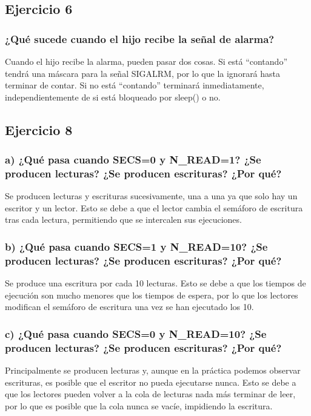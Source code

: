 \documentclass[]{article}
\begin{document}
\subsection*{Ejercicio 6}
\subsubsection*{¿Qué sucede cuando el hijo recibe la señal de alarma?}
Cuando el hijo recibe la alarma, pueden pasar dos cosas. Si está ``contando'' tendrá una máscara para la señal SIGALRM, por lo que la ignorará hasta terminar de contar. Si no está ``contando'' terminará inmediatamente, independientemente de si está bloqueado por sleep() o no.

\subsection*{Ejercicio 8}
\subsubsection*{a) ¿Qué pasa cuando SECS=0 y N\_READ=1? ¿Se producen lecturas? ¿Se producen escrituras? ¿Por qué?}
Se producen lecturas y escrituras sucesivamente, una a una ya que solo hay un escritor y un lector. Esto se debe a que el lector cambia el semáforo de escritura tras cada lectura, permitiendo que se intercalen sus ejecuciones.

\subsubsection*{b) ¿Qué pasa cuando SECS=1 y N\_READ=10? ¿Se producen lecturas? ¿Se producen escrituras? ¿Por qué?}
Se produce una escritura por cada 10 lecturas. Esto se debe a que los tiempos de ejecución son mucho menores que los tiempos de espera, por lo que los lectores modifican el semáforo de escritura una vez se han ejecutado los 10.

\subsubsection*{c) ¿Qué pasa cuando SECS=0 y N\_READ=10? ¿Se producen lecturas? ¿Se producen escrituras? ¿Por qué?}
Principalmente se producen lecturas y, aunque en la práctica podemos observar escrituras, es posible que el escritor no pueda ejecutarse nunca. Esto se debe a que los lectores pueden volver a la cola de lecturas nada más terminar de leer, por lo que es posible que la cola nunca se vacíe, impidiendo la escritura.
\end{document}
